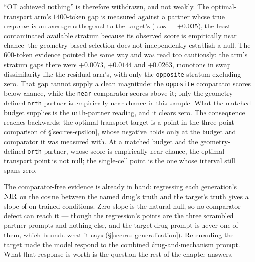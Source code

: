 ``OT achieved nothing'' is therefore withdrawn, and not weakly. The optimal-transport arm's
$1400$-token gap is measured against a partner whose true response is on average orthogonal to the
target's ($\cos = +0.035$), the least contaminated available stratum because its observed score is
empirically near chance; the geometry-based selection does not independently establish a null. The
$600$-token evidence pointed the same way and was
read too cautiously: the arm's stratum gaps there were $+0.0073$, $+0.0144$ and $+0.0263$, monotone
in swap dissimilarity like the residual arm's, with only the \texttt{opposite} stratum excluding
zero. That gap cannot supply a clean magnitude: the \texttt{opposite} comparator scores below
chance, while the \texttt{near} comparator scores above it; only the geometry-defined
\texttt{orth} partner is empirically near chance in this sample. What the matched
budget supplies is the \texttt{orth}-partner reading, and it clears zero. The consequence reaches
backwards: the optimal-transport target is a point in the three-point comparison of
\S\ref{sec:res-epsilon}, whose negative holds only at the budget and comparator it was
measured with. At a matched budget and the geometry-defined \texttt{orth} partner, whose score is
empirically near chance, the optimal-transport point is not null; the
single-cell point is the one whose interval still spans zero.

The comparator-free evidence is already in hand: regressing
each generation's $\textrm{NIR}$ on the cosine between the named drug's truth and the target's truth gives a
slope of  on trained conditions. Zero slope is the natural null,
so no comparator defect can reach it --- though the regression's points are the three scrambled
partner prompts and nothing else, and the target-drug prompt is never one of them, which bounds what
it says (\S\ref{sec:res-generalisation}). Re-encoding the target made the model respond to the combined
drug-and-mechanism prompt. What that response is worth is the question the rest of the chapter
answers.

